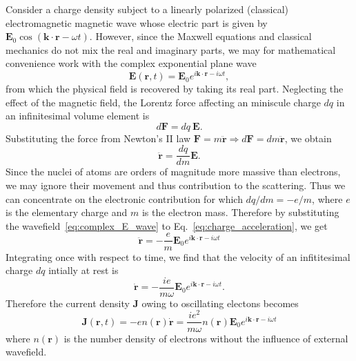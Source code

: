 \noindent
Consider a charge density subject to a linearly polarized (classical) electromagnetic magnetic wave whose electric part is given by $\mathbf{E}_0 \cos (\mathbf{k}\cdot\mathbf{r}- \omega t)$. However, since the Maxwell equations and classical mechanics do not mix the real and imaginary parts, we may for mathematical convenience work with the complex exponential plane wave 
\begin{equation}\label{eq:complex_E_wave}
\mathbf{E}(\mathbf{r},t) = \mathbf{E}_0 e^{i \mathbf{k}\cdot\mathbf{r}-i \omega t},
\end{equation}
from which the physical field is recovered by taking its real part. Neglecting the effect of the magnetic field, the Lorentz force affecting an miniscule charge $dq$ in an infinitesimal volume element is
\begin{equation}
d\mathbf{F} = dq \ \mathbf{E}.
\end{equation}
Substituting the force from Newton's II law $\mathbf{F} = m \ddot{\mathbf{r}} \Rightarrow d\mathbf{F} = dm \ddot{\mathbf{r}}$, we obtain
\begin{equation}\label{eq:charge_acceleration}
\ddot{\mathbf{r}} = \frac{dq}{dm} \mathbf{E}.
\end{equation}
Since the nuclei of atoms are orders of magnitude more massive than electrons, we may ignore their movement and thus contribution to the scattering. Thus we can concentrate on the electronic contribution for which $dq/dm = -e/m$, where $e$ is the elementary charge and $m$ is the electron mass. Therefore by substituting the wavefield~\eqref{eq:complex_E_wave} to Eq.~\eqref{eq:charge_acceleration}, we get
\begin{equation}
\ddot{\mathbf{r}} = -\frac{e}{m} \mathbf{E}_0 e^{i \mathbf{k}\cdot\mathbf{r}-i \omega t}
\end{equation}
Integrating once with respect to time, we find that the velocity of an infititesimal charge $dq$ intially at rest is
\begin{equation}
\dot{\mathbf{r}} = -\frac{ie}{m\omega} \mathbf{E}_0 e^{i \mathbf{k}\cdot\mathbf{r}-i \omega t}.
\end{equation}
Therefore the current density $\mathbf{J}$ owing to oscillating electons becomes
\begin{equation}\label{eq:oscillating_J}
\mathbf{J}(\mathbf{r},t) = -en(\mathbf{r})\dot{\mathbf{r}} =
\frac{ie^2}{m\omega} n(\mathbf{r}) \mathbf{E}_0 e^{i \mathbf{k}\cdot\mathbf{r}-i \omega t}
\end{equation}
where $n(\mathbf{r})$ is the number density of electrons without the influence of external wavefield.

